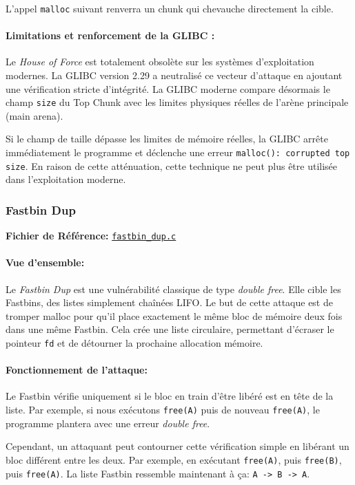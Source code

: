 L'appel \texttt{malloc} suivant renverra un chunk qui chevauche directement la cible.

\paragraph{Limitations et renforcement de la GLIBC :}
Le \textit{House of Force} est totalement obsolète sur les systèmes d'exploitation modernes. La GLIBC version 2.29 a neutralisé ce vecteur d'attaque en ajoutant une vérification stricte d'intégrité. La GLIBC moderne compare désormais le champ \texttt{size} du Top Chunk avec les limites physiques réelles de l'arène principale (main arena).

Si le champ de taille dépasse les limites de mémoire réelles, la GLIBC arrête immédiatement le programme et déclenche une erreur \texttt{malloc(): corrupted top size}. En raison de cette atténuation, cette technique ne peut plus être utilisée dans l'exploitation moderne.

\subsubsection{Fastbin Dup}

\noindent\textbf{Fichier de Référence:} \href{https://github.com/shellphish/how2heap/blob/master/glibc_2.41/fastbin_dup.c}{\texttt{fastbin\_dup.c}}

\paragraph{Vue d'ensemble:}
Le \textit{Fastbin Dup} est une vulnérabilité classique de type \textit{double free}. Elle cible les Fastbins, des listes simplement chaînées LIFO. Le but de cette attaque est de tromper malloc pour qu'il place exactement le même bloc de mémoire deux fois dans une même Fastbin. Cela crée une liste circulaire, permettant d'écraser le pointeur \texttt{fd} et de détourner la prochaine allocation mémoire.

\paragraph{Fonctionnement de l'attaque:}
Le Fastbin vérifie uniquement si le bloc en train d'être libéré est en tête de la liste. Par exemple, si nous exécutons \texttt{free(A)} puis de nouveau \texttt{free(A)}, le programme plantera avec une erreur \textit{double free}.

Cependant, un attaquant peut contourner cette vérification simple en libérant un bloc différent entre les deux. Par exemple, en exécutant \texttt{free(A)}, puis \texttt{free(B)}, puis \texttt{free(A)}. La liste Fastbin ressemble maintenant à ça: \texttt{A -> B -> A}.

